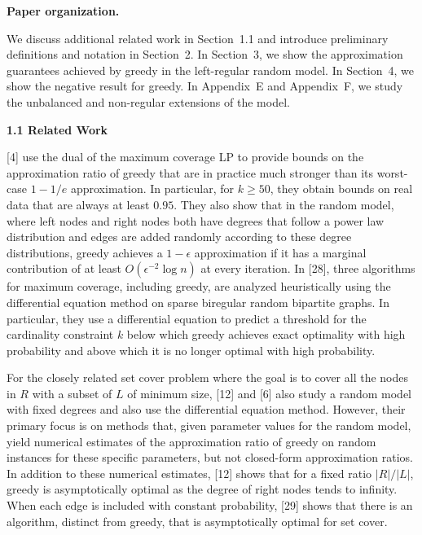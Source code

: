 \documentclass[10pt,a4paper]{article}
\begin{document}
\par\medskip\noindent\textbf{Paper organization.}\par




We discuss additional related work in Section 1.1 and introduce preliminary definitions and notation in Section 2. In Section 3, we show the approximation guarantees achieved by greedy in the left-regular random model. In Section 4, we show the negative result for greedy. In Appendix E and Appendix F, we study the unbalanced and non-regular extensions of the model.\par





\par\medskip\noindent\textbf{1.1 Related Work}\par




[4] use the dual of the maximum coverage LP to provide bounds on the approximation ratio of greedy that are in practice much stronger than its worst-case $1-1/e$ approximation. In particular, for $k\geq 50$, they obtain bounds on real data that are always at least $0.95$. They also show that in the random model, where left nodes and right nodes both have degrees that follow a power law distribution and edges are added randomly according to these degree distributions, greedy achieves a $1-\epsilon$ approximation if it has a marginal contribution of at least $O(\epsilon^{-2}\log n)$ at every iteration. In [28], three algorithms for maximum coverage, including greedy, are analyzed heuristically using the differential equation method on sparse biregular random bipartite graphs. In particular, they use a differential equation to predict a threshold for the cardinality constraint $k$ below which greedy achieves exact optimality with high probability and above which it is no longer optimal with high probability.\par




For the closely related set cover problem where the goal is to cover all the nodes in $R$ with a subset of $L$ of minimum size, [12] and [6] also study a random model with fixed degrees and also use the differential equation method. However, their primary focus is on methods that, given parameter values for the random model, yield numerical estimates of the approximation ratio of greedy on random instances for these specific parameters, but not closed-form approximation ratios. In addition to these numerical estimates, [12] shows that for a fixed ratio $|R|/|L|$, greedy is asymptotically optimal as the degree of right nodes tends to infinity. When each edge is included with constant probability, [29] shows that there is an algorithm, distinct from greedy, that is asymptotically optimal for set cover.\par
\end{document}
